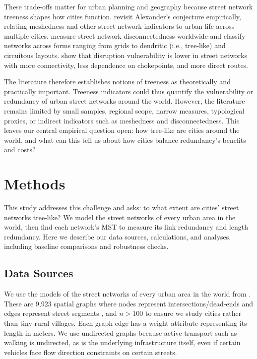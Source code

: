 \documentclass[12pt,letterpaper]{article} %
\begin{document}
These trade-offs matter for urban planning and geography because street network treeness shapes how cities function. \citet{huang_city_2022} revisit Alexander's conjecture empirically, relating meshedness and other street network indicators to urban life across multiple cities. \citet{barringtonleigh_2019_global} measure street network disconnectedness worldwide and classify networks across forms ranging from grids to dendritic (i.e., tree-like) and circuitous layouts. \citet{boeing_2024_resilient} show that disruption vulnerability is lower in street networks with more connectivity, less dependence on chokepoints, and more direct routes.

The literature therefore establishes notions of treeness as theoretically and practically important. Treeness indicators could thus quantify the vulnerability or redundancy of urban street networks around the world. However, the literature remains limited by small samples, regional scope, narrow measures, typological proxies, or indirect indicators such as meshedness and disconnectedness. This leaves our central empirical question open: how tree-like are cities around the world, and what can this tell us about how cities balance redundancy's benefits and costs?

\section{Methods}

This study addresses this challenge and asks: to what extent are cities' street networks tree-like? We model the street networks of every urban area in the world, then find each network's MST to measure its link redundancy and length redundancy. Here we describe our data sources, calculations, and analyses, including baseline comparisons and robustness checks.

\subsection{Data Sources}

We use the models of the street networks of every urban area in the world from \citet{boeing_urban_2026}. These are 9,923 spatial graphs where nodes represent intersections/dead-ends and edges represent street segments \citep{boeing_topological_2025}, and $n > 100$ to ensure we study cities rather than tiny rural villages. Each graph edge has a weight attribute representing its length in meters. We use undirected graphs because active transport such as walking is undirected, as is the underlying infrastructure itself, even if certain vehicles face flow direction constraints on certain streets.
\end{document}
